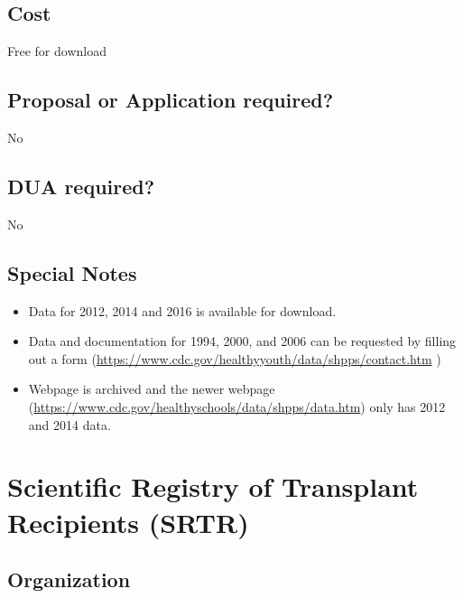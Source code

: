\documentclass[
]{book}
\providecommand{\tightlist}{%
  \setlength{\itemsep}{0pt}\setlength{\parskip}{0pt}}
\begin{document}
\hypertarget{cost-76}{%
\section{Cost}\label{cost-76}}

Free for download

\hypertarget{proposal-or-application-required-76}{%
\section{Proposal or Application required?}\label{proposal-or-application-required-76}}

No

\hypertarget{dua-required-76}{%
\section{DUA required?}\label{dua-required-76}}

No

\hypertarget{special-notes-76}{%
\section{Special Notes}\label{special-notes-76}}

\begin{itemize}
\tightlist
\item
  Data for 2012, 2014 and 2016 is available for download.
\item
  Data and documentation for 1994, 2000, and 2006 can be requested by filling out a form (\url{https://www.cdc.gov/healthyyouth/data/shpps/contact.htm} )
\item
  Webpage is archived and the newer webpage (\url{https://www.cdc.gov/healthyschools/data/shpps/data.htm}) only has 2012 and 2014 data.
\end{itemize}

\mainmatter

\hypertarget{scientific-registry-of-transplant-recipients-srtr}{%
\chapter{Scientific Registry of Transplant Recipients (SRTR)}\label{scientific-registry-of-transplant-recipients-srtr}}

\hypertarget{organization-77}{%
\section{Organization}\label{organization-77}}
\end{document}
